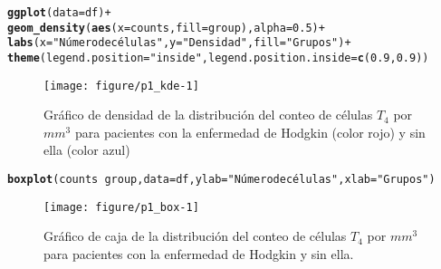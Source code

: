 \documentclass[paper=letter, fontsize=11pt, draft=false]{scrartcl}\usepackage[]{graphicx}\usepackage[]{xcolor}
\makeatletter
\def\maxwidth{ %
  \ifdim\Gin@nat@width>\linewidth
    \linewidth
  \else
    \Gin@nat@width
  \fi
}
\newcommand{\hlnum}[1]{\textcolor[rgb]{0.686,0.059,0.569}{#1}}%
\newcommand{\hlsng}[1]{\textcolor[rgb]{0.192,0.494,0.8}{#1}}%
\newcommand{\hlopt}[1]{\textcolor[rgb]{0,0,0}{#1}}%
\newcommand{\hldef}[1]{\textcolor[rgb]{0.345,0.345,0.345}{#1}}%
\newcommand{\hlkwc}[1]{\textcolor[rgb]{0.333,0.667,0.333}{#1}}%
\newcommand{\hlkwd}[1]{\textcolor[rgb]{0.737,0.353,0.396}{\textbf{#1}}}%
\newenvironment{kframe}{%
 \def\at@end@of@kframe{}%
 \ifinner\ifhmode%
  \def\at@end@of@kframe{\end{minipage}}%
  \begin{minipage}{\columnwidth}%
 \fi\fi%
 \def\FrameCommand##1{\hskip\@totalleftmargin \hskip-\fboxsep
 \colorbox{shadecolor}{##1}\hskip-\fboxsep
     \hskip-\linewidth \hskip-\@totalleftmargin \hskip\columnwidth}%
 \MakeFramed {\advance\hsize-\width
   \@totalleftmargin\z@ \linewidth\hsize
   \@setminipage}}%
 {\par\unskip\endMakeFramed%
 \at@end@of@kframe}
\newenvironment{knitrout}{}{} %
\numberwithin{equation}{problemcounter} %
\numberwithin{figure}{problemcounter} %
\numberwithin{table}{problemcounter} %
\numberwithin{subsection}{problemcounter}
\makeatother
\begin{document}
\begin{knitrout}
\color{fgcolor}\begin{kframe}
\begin{alltt}
\hlkwd{ggplot}\hldef{(}\hlkwc{data} \hldef{= df)} \hlopt{+}
  \hlkwd{geom_density}\hldef{(}\hlkwd{aes}\hldef{(}\hlkwc{x} \hldef{= counts,} \hlkwc{fill} \hldef{= group),} \hlkwc{alpha} \hldef{=} \hlnum{0.5}\hldef{)} \hlopt{+}
  \hlkwd{labs}\hldef{(}\hlkwc{x} \hldef{=} \hlsng{"Número de células"}\hldef{,} \hlkwc{y} \hldef{=} \hlsng{"Densidad"}\hldef{,} \hlkwc{fill} \hldef{=} \hlsng{"Grupos"}\hldef{)} \hlopt{+}
    \hlkwd{theme}\hldef{(}\hlkwc{legend.position}\hldef{=}\hlsng{"inside"}\hldef{,}\hlkwc{legend.position.inside} \hldef{=} \hlkwd{c}\hldef{(}\hlnum{0.9}\hldef{,} \hlnum{0.9}\hldef{))}
\end{alltt}
\end{kframe}\begin{figure}

{\centering \texttt{[image: figure/p1\_kde-1]} 

}

\caption[Gráfico de densidad de la distribución del conteo de células $T_4$ por $mm^3$ para pacientes con la enfermedad de Hodgkin (color rojo) y sin ella (color azul)]{Gráfico de densidad de la distribución del conteo de células $T_4$ por $mm^3$ para pacientes con la enfermedad de Hodgkin (color rojo) y sin ella (color azul)}\label{fig:p1_kde}
\end{figure}

\end{knitrout}

\begin{knitrout}
\color{fgcolor}\begin{kframe}
\begin{alltt}
\hlkwd{boxplot}\hldef{(counts} \hlopt{~} \hldef{group,} \hlkwc{data}\hldef{=df,} \hlkwc{ylab}\hldef{=}\hlsng{"Número de células"}\hldef{,} \hlkwc{xlab}\hldef{=}\hlsng{"Grupos"}\hldef{)}
\end{alltt}
\end{kframe}\begin{figure}

{\centering \texttt{[image: figure/p1\_box-1]} 

}

\caption[Gráfico de caja de la distribución del conteo de células $T_4$ por $mm^3$ para pacientes con la enfermedad de Hodgkin y sin ella]{Gráfico de caja de la distribución del conteo de células $T_4$ por $mm^3$ para pacientes con la enfermedad de Hodgkin y sin ella.}\label{fig:p1_box}
\end{figure}

\end{knitrout}
\end{document}
